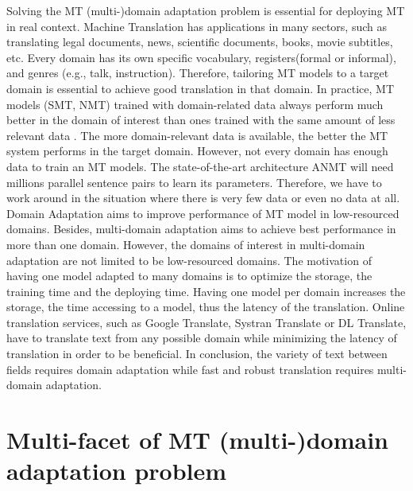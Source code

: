 Solving the MT (multi-)domain adaptation problem is essential for deploying MT in real context. Machine Translation has applications in many sectors, such as translating legal documents, news, scientific documents, books, movie subtitles, etc. Every domain has its own specific vocabulary, registers(formal or informal), and genres (e.g., talk, instruction). Therefore, tailoring MT models to a target domain is essential to achieve good translation in that domain. In practice, MT models (SMT, NMT) trained with domain-related data always perform much better in the domain of interest than ones trained with the same amount of less relevant data \citep{Rico13domain, Saunders21Domain}. The more domain-relevant data is available, the better the MT system performs in the target domain. However, not every domain has enough data to train an MT models. The state-of-the-art architecture ANMT will need millions parallel sentence pairs to learn its parameters. Therefore, we have to work around in the situation where there is very few data or even no data at all. Domain Adaptation aims to improve performance of MT model in low-resourced domains. Besides, multi-domain adaptation aims to achieve best performance in more than one domain. However, the domains of interest in multi-domain adaptation are not limited to be low-resourced domains. The motivation of having one model adapted to many domains is to optimize the storage, the training time and the deploying time. Having one model per domain increases the storage, the time accessing to a model, thus the latency of the translation. Online translation services, such as Google Translate, Systran Translate or DL Translate, have to translate text from any possible domain while minimizing the latency of translation in order to be beneficial. In conclusion, the variety of text between fields requires domain adaptation while fast and robust translation requires multi-domain adaptation.

\section{Multi-facet of MT (multi-)domain adaptation problem}
\label{sec:multi-facet}
